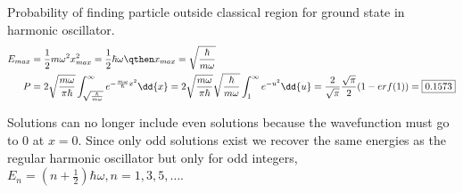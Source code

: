 \documentclass{homework}
\begin{document}
\newpage
\question
Probability of finding particle outside classical region for ground state in harmonic oscillator.
\begin{align*}
	E_{max}
		&=	\frac{1}{2} m \omega^2 x_{max}^2
		=	\frac{1}{2} \hbar \omega
		\qthen
		x_{max} =	\sqrt{\frac{\hbar}{m\omega}}	\\
	P
		&=	2\sqrt{\frac{m\omega}{\pi\hbar}}	\int_{\sqrt{\frac{\hbar}{m\omega}}}^{\infty}	e^{-\frac{m\omega}{\hbar}x^2}	\dd{x}
		=	2\sqrt{\frac{m\omega}{\pi\hbar}}\sqrt{\frac{\hbar}{m\omega}}	\int_{1}^{\infty}	e^{-u^2}	\dd{u}
		=	\frac{2}{\sqrt{\pi}} \frac{\sqrt{\pi}}{2} (1-erf(1))
		=	\boxed{0.1573}
\end{align*}


\question


\question
Solutions can no longer include even solutions because the wavefunction must go to 0 at $x=0$. Since only odd solutions exist we recover the same energies as the regular harmonic oscillator but only for odd integers, $E_n = (n+\frac{1}{2})\hbar\omega, n = 1, 3, 5, \dots$.
\end{document}
